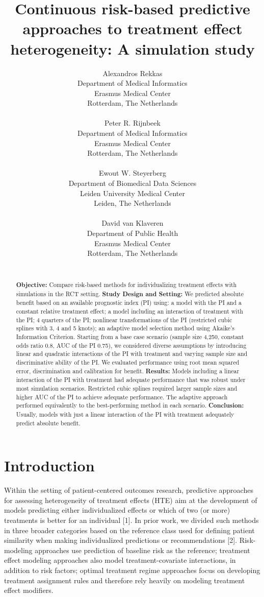 \documentclass{article}
\title{Continuous risk-based predictive approaches to treatment effect
heterogeneity: A simulation study}
\author{
    Alexandros Rekkas
   \\
    Department of Medical Informatics \\
    Erasmus Medical Center \\
  Rotterdam, The Netherlands \\
  \texttt{} \\
   \And
    Peter R. Rijnbeek
   \\
    Department of Medical Informatics \\
    Erasmus Medical Center \\
  Rotterdam, The Netherlands \\
  \texttt{} \\
   \And
    Ewout W. Steyerberg
   \\
    Department of Biomedical Data Sciences \\
    Leiden University Medical Center \\
  Leiden, The Netherlands \\
  \texttt{} \\
   \And
    David van Klaveren
   \\
    Department of Public Health \\
    Erasmus Medical Center \\
  Rotterdam, The Netherlands \\
  \texttt{} \\
  }
\date{}
\begin{document}
\maketitle

\def\tightlist{}


\begin{abstract}
\textbf{Objective:} Compare risk-based methods for individualizing
treatment effects with simulations in the RCT setting. \textbf{Study
Design and Setting:} We predicted absolute benefit based on an available
prognostic index (PI) using: a model with the PI and a constant relative
treatment effect; a model including an interaction of treatment with the
PI; 4 quarters of the PI; nonlinear transformations of the PI
(restricted cubic splines with 3, 4 and 5 knots); an adaptive model
selection method using Akaike's Information Criterion. Starting from a
base case scenario (sample size 4,250, constant odds ratio 0.8, AUC of
the PI 0.75), we considered diverse assumptions by introducing linear
and quadratic interactions of the PI with treatment and varying sample
size and discriminative ability of the PI. We evaluated performance
using root mean squared error, discrimination and calibration for
benefit. \textbf{Results:} Models including a linear interaction of the
PI with treatment had adequate performance that was robust under most
simulation scenarios. Restricted cubic splines required larger sample
sizes and higher AUC of the PI to achieve adequate performance. The
adaptive approach performed equivalently to the best-performing method
in each scenario. \textbf{Conclusion:} Usually, models with just a
linear interaction of the PI with treatment adequately predict absolute
benefit.
\end{abstract}


\linenumbers

\hypertarget{introduction}{%
\section{Introduction}\label{introduction}}

Within the setting of patient-centered outcomes research, predictive
approaches for assessing heterogeneity of treatment effects (HTE) aim at
the development of models predicting either individualized effects or
which of two (or more) treatments is better for an individual {[}1{]}.
In prior work, we divided such methods in three broader categories based
on the reference class used for defining patient similarity when making
individualized predictions or recommendations {[}2{]}. Risk-modeling
approaches use prediction of baseline risk as the reference; treatment
effect modeling approaches also model treatment-covariate interactions,
in addition to risk factors; optimal treatment regime approaches focus
on developing treatment assignment rules and therefore rely heavily on
modeling treatment effect modifiers.
\end{document}
